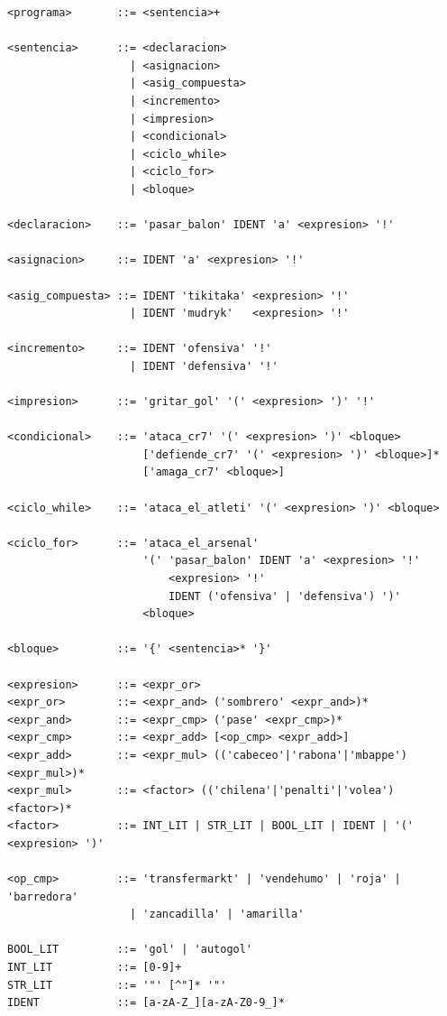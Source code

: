 \documentclass[12pt,a4paper]{article}
\begin{document}
\begin{Verbatim}[frame=single, fontsize=\small]
<programa>       ::= <sentencia>+

<sentencia>      ::= <declaracion>
                   | <asignacion>
                   | <asig_compuesta>
                   | <incremento>
                   | <impresion>
                   | <condicional>
                   | <ciclo_while>
                   | <ciclo_for>
                   | <bloque>

<declaracion>    ::= 'pasar_balon' IDENT 'a' <expresion> '!'

<asignacion>     ::= IDENT 'a' <expresion> '!'

<asig_compuesta> ::= IDENT 'tikitaka' <expresion> '!'
                   | IDENT 'mudryk'   <expresion> '!'

<incremento>     ::= IDENT 'ofensiva' '!'
                   | IDENT 'defensiva' '!'

<impresion>      ::= 'gritar_gol' '(' <expresion> ')' '!'

<condicional>    ::= 'ataca_cr7' '(' <expresion> ')' <bloque>
                     ['defiende_cr7' '(' <expresion> ')' <bloque>]*
                     ['amaga_cr7' <bloque>]

<ciclo_while>    ::= 'ataca_el_atleti' '(' <expresion> ')' <bloque>

<ciclo_for>      ::= 'ataca_el_arsenal'
                     '(' 'pasar_balon' IDENT 'a' <expresion> '!'
                         <expresion> '!'
                         IDENT ('ofensiva' | 'defensiva') ')'
                     <bloque>

<bloque>         ::= '{' <sentencia>* '}'

<expresion>      ::= <expr_or>
<expr_or>        ::= <expr_and> ('sombrero' <expr_and>)*
<expr_and>       ::= <expr_cmp> ('pase' <expr_cmp>)*
<expr_cmp>       ::= <expr_add> [<op_cmp> <expr_add>]
<expr_add>       ::= <expr_mul> (('cabeceo'|'rabona'|'mbappe') <expr_mul>)*
<expr_mul>       ::= <factor> (('chilena'|'penalti'|'volea') <factor>)*
<factor>         ::= INT_LIT | STR_LIT | BOOL_LIT | IDENT | '(' <expresion> ')'

<op_cmp>         ::= 'transfermarkt' | 'vendehumo' | 'roja' | 'barredora'
                   | 'zancadilla' | 'amarilla'

BOOL_LIT         ::= 'gol' | 'autogol'
INT_LIT          ::= [0-9]+
STR_LIT          ::= '"' [^"]* '"'
IDENT            ::= [a-zA-Z_][a-zA-Z0-9_]*
\end{Verbatim}
\end{document}
